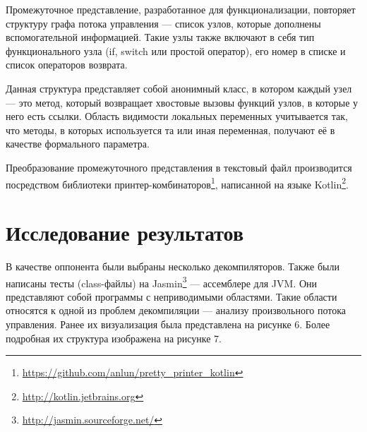 Промежуточное представление, разработанное для функционализации, повторяет структуру графа потока управления --- список узлов, которые дополнены вспомогательной информацией. Такие узлы также включают в себя тип функционального узла (if, switch или простой оператор), его номер в списке и список операторов возврата. 

Данная структура представляет собой анонимный класс, в котором каждый узел --- это метод, который возвращает хвостовые вызовы функций узлов, в которые у него есть ссылки. Область видимости локальных переменных учитывается так, что методы, в которых используется та или иная переменная, получают её в качестве формального параметра. 

Преобразование промежуточного представления в текстовый файл производится посредством библиотеки принтер-комбинаторов\footnote{\url{https://github.com/anlun/pretty\_printer\_kotlin}}, написанной на языке Kotlin\footnote{\url{http://kotlin.jetbrains.org}}.

\section{Исследование результатов}

В качестве оппонента были выбраны несколько декомпиляторов. Также были написаны тесты (class-файлы) на Jasmin\footnote{\url{http://jasmin.sourceforge.net/}} --- ассемблере для JVM. Они представляют собой программы с неприводимыми областями. Такие области относятся к одной из проблем декомпиляции --- анализу произвольного потока управления. Ранее их визуализация была представлена на рисунке 6. Более подробная их структура изображена на рисунке 7.

